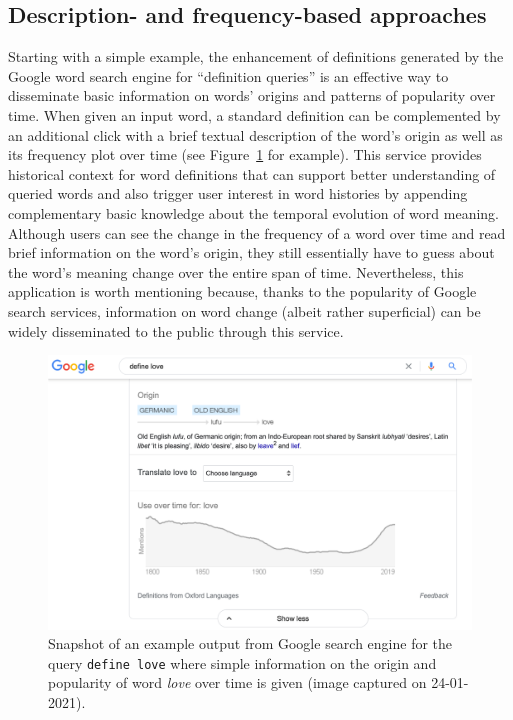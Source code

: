 \documentclass[output=paper%
]{langsci/langscibook}
\begin{document}
\subsection{Description- and frequency-based approaches}
Starting with a simple example, the enhancement of definitions generated by the Google word search engine for ``definition queries'' is an effective way to disseminate basic information on words' origins and patterns of  popularity over time. When given an input word, a standard definition can be complemented by an additional click with a brief textual description of the word's origin as well as its frequency plot over time (see Figure~\ref{fig:google-snapshot} for example). This service provides historical context for word definitions that can support better understanding of queried words and also trigger user interest in word histories by appending complementary basic knowledge about the temporal evolution of word meaning. Although users can see the change in the frequency of a word over time and read brief information on the word's origin, they still essentially have to guess about the word's meaning change over the entire span of time. Nevertheless, this application is worth mentioning because, thanks to the popularity of Google search services, information on word change (albeit rather superficial) can be widely disseminated to the public through this service.

\begin{figure}
	\includegraphics[width=\textwidth]{figures/JATOWT_google_snapshot.png}
        \caption{Snapshot of an example output from Google search engine for the query \texttt{define love} where simple information on the origin and popularity of word \textit{love} over time is given (image captured on 24-01-2021).}
	\label{fig:google-snapshot}
\end{figure}
\end{document}
